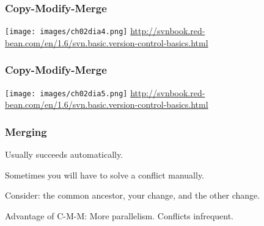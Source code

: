 \begin{frame}
\frametitle{Copy-Modify-Merge}
\begin{changemargin}{1cm}

\begin{center}
	\texttt{[image: images/ch02dia4.png]}
	\hfill {\tiny \url{http://svnbook.red-bean.com/en/1.6/svn.basic.version-control-basics.html}} 
\end{center}


\end{changemargin}
\end{frame}

\begin{frame}
\frametitle{Copy-Modify-Merge}
\begin{changemargin}{1cm}
\begin{center}
	\texttt{[image: images/ch02dia5.png]}
	\hfill {\tiny \url{http://svnbook.red-bean.com/en/1.6/svn.basic.version-control-basics.html}} 
\end{center}


\end{changemargin}
\end{frame}

\begin{frame}
\frametitle{Merging}
\begin{changemargin}{1cm}
Usually succeeds automatically.

Sometimes you will have to solve a conflict manually.

Consider: the common ancestor, your change, and the other change.

Advantage of C-M-M: More parallelism. Conflicts infrequent.

\end{changemargin}
\end{frame}

